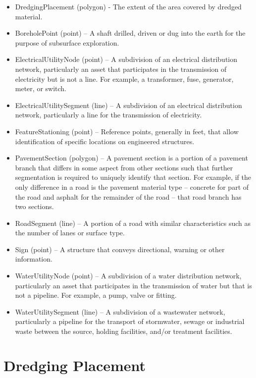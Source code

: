 \documentclass[
  letterpaper,
  DIV=11,
  numbers=noendperiod]{scrreprt}
\providecommand{\tightlist}{%
  \setlength{\itemsep}{0pt}\setlength{\parskip}{0pt}}
\begin{document}
\begin{itemize}
\tightlist
\item
  DredgingPlacement (polygon) - The extent of the area covered by
  dredged material.
\item
  BoreholePoint (point) -- A shaft drilled, driven or dug into the earth
  for the purpose of subsurface exploration.
\item
  ElectricalUtilityNode (point) -- A subdivision of an electrical
  distribution network, particularly an asset that participates in the
  transmission of electricity but is not a line. For example, a
  transformer, fuse, generator, meter, or switch.
\item
  ElectricalUtilitySegment (line) -- A subdivision of an electrical
  distribution network, particularly a line for the transmission of
  electricity.
\item
  FeatureStationing (point) -- Reference points, generally in feet, that
  allow identification of specific locations on engineered structures.
\item
  PavementSection (polygon) -- A pavement section is a portion of a
  pavement branch that differs in some aspect from other sections such
  that further segmentation is required to uniquely identify that
  section. For example, if the only difference in a road is the pavement
  material type -- concrete for part of the road and asphalt for the
  remainder of the road -- that road branch has two sections.
\item
  RoadSegment (line) -- A portion of a road with similar characteristics
  such as the number of lanes or surface type.
\item
  Sign (point) -- A structure that conveys directional, warning or other
  information.
\item
  WaterUtilityNode (point) -- A subdivision of a water distribution
  network, particularly an asset that participates in the transmission
  of water but that is not a pipeline. For example, a pump, valve or
  fitting.
\item
  WaterUtilitySegment (line) -- A subdivision of a wastewater network,
  particularly a pipeline for the transport of stormwater, sewage or
  industrial waste between the source, holding facilities, and/or
  treatment facilities.
\end{itemize}

\chapter{Dredging Placement}\label{dredging-placement}
\end{document}
